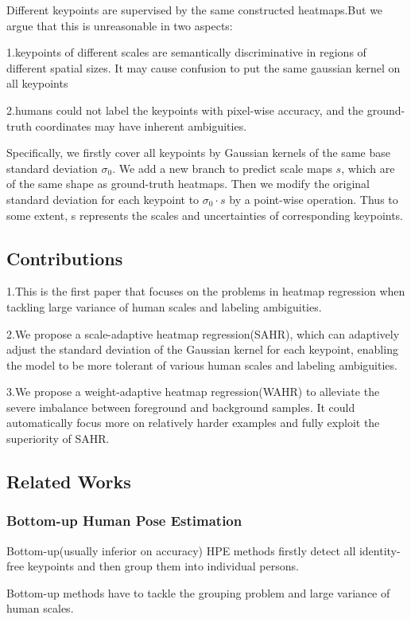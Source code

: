 \documentclass[11pt]{article}
\begin{document}
Different keypoints are supervised by the same constructed heatmaps.But we argue that this is unreasonable in two aspects:

1.keypoints of different scales are semantically discriminative in regions of different spatial sizes. It may cause confusion to put the same gaussian kernel on all keypoints

2.humans could not label the keypoints with pixel-wise accuracy, and the ground-truth coordinates may have inherent ambiguities.

Specifically, we firstly cover all keypoints by Gaussian kernels of the same base standard deviation $\sigma_0$. We add a new branch to predict scale maps $s$, which are of the same shape as ground-truth heatmaps. Then we modify the original standard deviation for each keypoint to $\sigma_0\cdot s$ by a point-wise operation. Thus to some extent, s represents the scales and uncertainties of corresponding keypoints.

\subsection{Contributions}
1.This is the first paper that focuses on the problems in heatmap regression when tackling large variance of human scales and labeling ambiguities.

2.We propose a scale-adaptive heatmap regression(SAHR), which can adaptively adjust the standard deviation of the Gaussian kernel for each keypoint, enabling the model to be more tolerant of various human scales and labeling ambiguities.

3.We propose a weight-adaptive heatmap regression(WAHR) to alleviate the severe imbalance between foreground and background samples. It could automatically focus more on relatively harder examples and fully exploit the superiority of SAHR.
\subsection{Related Works}
\subsubsection{Bottom-up Human Pose Estimation}
Bottom-up(usually inferior on accuracy) HPE methods firstly detect all identity-free keypoints and then group them into individual persons.

Bottom-up methods have to tackle the grouping problem and large variance of human scales.
\end{document}
